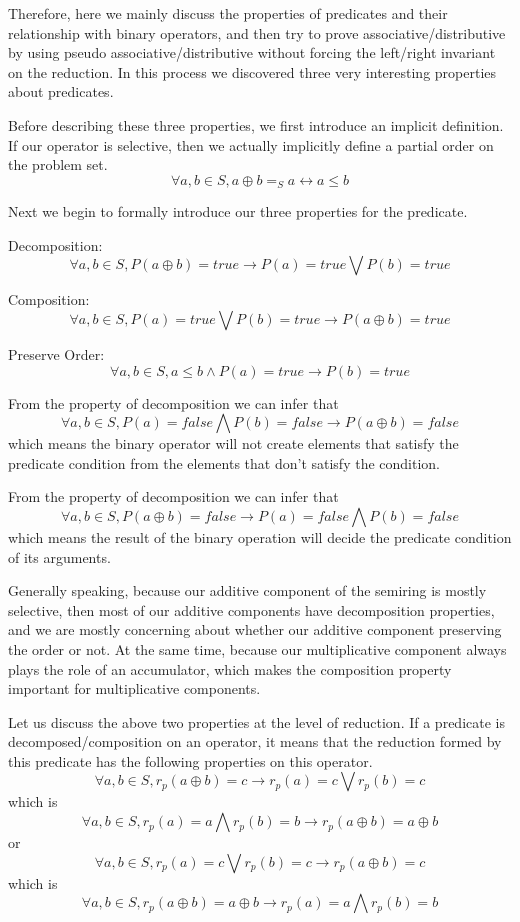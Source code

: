 \documentclass[a4paper,10pt]{article}
\newcommand{\e}[2]{
\begin{equation}
  \label{#1} 
  #2
\end{equation}
}
\begin{document}
Therefore, here we mainly discuss the properties of predicates and their relationship with binary operators, and then try to prove associative/distributive by using pseudo associative/distributive without forcing the left/right invariant on the reduction. In this process we discovered three very interesting properties about predicates. 

Before describing these three properties, we first introduce an implicit definition. If our operator is selective, then we actually implicitly define a partial order on the problem set.
\[\forall a,b \in S, a \oplus b =_S a \leftrightarrow a \leq b\]

Next we begin to formally introduce our three properties for the predicate.

Decomposition: \e{pr:def:decomposition}{\forall a,b \in S, P(a \oplus b)= true \rightarrow P(a) = true \bigvee P (b) = true}
Composition: \e{pr:def:composition}{\forall a,b \in S, P(a) = true \bigvee P (b) = true \rightarrow P(a \oplus b)= true}
Preserve Order: \e{pr:def:preserve_order}{\forall a,b \in S, a \leq b \wedge P(a) = true \rightarrow P(b) = true}
From the property of decomposition we can infer that \e{pr:proof:decomposition_contra}{\forall a,b \in S, P(a) = false \bigwedge P (b) = false \rightarrow P(a \oplus b)= false} which means the binary operator will not create elements that satisfy the predicate condition from the elements that don't satisfy the condition.

From the property of decomposition we can infer that \e{pr:proof:composition_contra}{\forall a,b \in S, P(a \oplus b)= false \rightarrow P(a) = false \bigwedge P (b) = false} which means the result of the binary operation will decide the predicate condition of its arguments.

Generally speaking, because our additive component of the semiring is mostly selective, then most of our additive components have decomposition properties, and we are mostly concerning about whether our additive component preserving the order or not. At the same time, because our multiplicative component always plays the role of an accumulator, which makes the composition property important for multiplicative components.

Let us discuss the above two properties at the level of reduction. If a predicate is decomposed/composition on an operator, it means that the reduction formed by this predicate has the following properties on this operator.
\[\forall a,b \in S, r_p(a\oplus b) = c \rightarrow r_p(a) = c \bigvee r_p (b) = c\] 
which is 
\[\forall a,b \in S, r_p(a) = a \bigwedge r_p (b) = b \rightarrow r_p(a \oplus b)= a \oplus b\]
or
\[\forall a,b \in S, r_p(a) = c \bigvee r_p (b) = c \rightarrow r_p(a \oplus b)= c\]
which is 
\[\forall a,b \in S, r_p(a\oplus b) = a \oplus b \rightarrow r_p(a) = a \bigwedge r_p (b) = b\]
\end{document}
